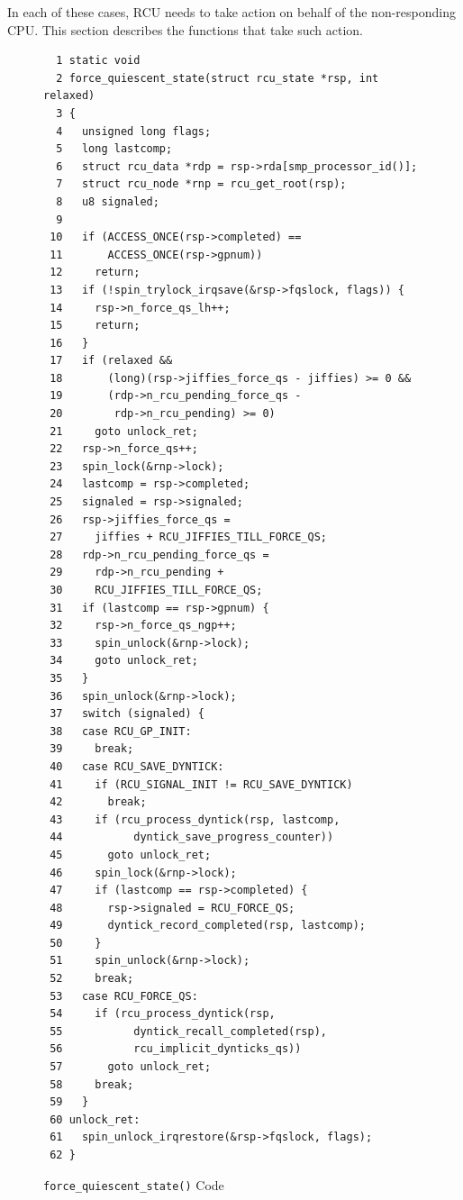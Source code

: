 In each of these cases, RCU needs to take action on behalf of the
non-responding CPU.
This section describes the functions that take such action.



\begin{figure}[tbp]
{ \scriptsize
\begin{verbatim}
  1 static void
  2 force_quiescent_state(struct rcu_state *rsp, int relaxed)
  3 {
  4   unsigned long flags;
  5   long lastcomp;
  6   struct rcu_data *rdp = rsp->rda[smp_processor_id()];
  7   struct rcu_node *rnp = rcu_get_root(rsp);
  8   u8 signaled;
  9 
 10   if (ACCESS_ONCE(rsp->completed) ==
 11       ACCESS_ONCE(rsp->gpnum))
 12     return;
 13   if (!spin_trylock_irqsave(&rsp->fqslock, flags)) {
 14     rsp->n_force_qs_lh++;
 15     return;
 16   }
 17   if (relaxed &&
 18       (long)(rsp->jiffies_force_qs - jiffies) >= 0 &&
 19       (rdp->n_rcu_pending_force_qs -
 20        rdp->n_rcu_pending) >= 0)
 21     goto unlock_ret;
 22   rsp->n_force_qs++;
 23   spin_lock(&rnp->lock);
 24   lastcomp = rsp->completed;
 25   signaled = rsp->signaled;
 26   rsp->jiffies_force_qs =
 27     jiffies + RCU_JIFFIES_TILL_FORCE_QS;
 28   rdp->n_rcu_pending_force_qs =
 29     rdp->n_rcu_pending +
 30     RCU_JIFFIES_TILL_FORCE_QS;
 31   if (lastcomp == rsp->gpnum) {
 32     rsp->n_force_qs_ngp++;
 33     spin_unlock(&rnp->lock);
 34     goto unlock_ret;
 35   }
 36   spin_unlock(&rnp->lock);
 37   switch (signaled) {
 38   case RCU_GP_INIT:
 39     break;
 40   case RCU_SAVE_DYNTICK:
 41     if (RCU_SIGNAL_INIT != RCU_SAVE_DYNTICK)
 42       break;
 43     if (rcu_process_dyntick(rsp, lastcomp,
 44           dyntick_save_progress_counter))
 45       goto unlock_ret;
 46     spin_lock(&rnp->lock);
 47     if (lastcomp == rsp->completed) {
 48       rsp->signaled = RCU_FORCE_QS;
 49       dyntick_record_completed(rsp, lastcomp);
 50     }
 51     spin_unlock(&rnp->lock);
 52     break;
 53   case RCU_FORCE_QS:
 54     if (rcu_process_dyntick(rsp,
 55           dyntick_recall_completed(rsp),
 56           rcu_implicit_dynticks_qs))
 57       goto unlock_ret;
 58     break;
 59   }
 60 unlock_ret:
 61   spin_unlock_irqrestore(&rsp->fqslock, flags);
 62 }
\end{verbatim}
}
\caption{{\tt force\_quiescent\_state()} Code}
\label{fig:app:rcuimpl:rcutreewt:Code for rcutree force-quiescent-state}
\end{figure}

